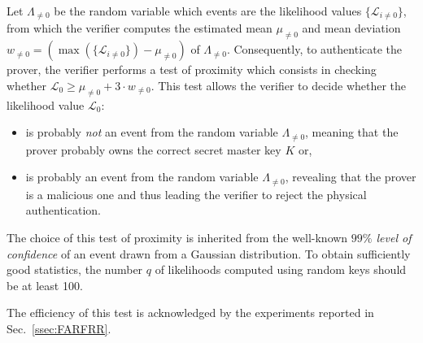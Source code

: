 Let \(\Lambda_{\not={0}}\) be the random variable which events are the likelihood values $\{\mathcal{L}_{i\not={0}}\}$, from which the verifier computes the estimated mean \(\mu_{\not={0}} \) and mean deviation $w_{\not={0}}=(\max(\{\mathcal{L}_{i\not={0}}\}) - \mu_{\not={0}})$ of  $\Lambda_{\not={0}}$. Consequently, to authenticate the prover, the verifier performs a test of proximity which consists in checking whether \(\mathcal{L}_0 \geq \mu_{\not={0}} + 3\cdot w_{\not={0}} \).
This test allows the verifier to decide whether the likelihood value \(\mathcal{L}_0 \):
\begin{itemize}
\item is probably {\it not} an event from the random variable \(\Lambda_{\not={0}}\), meaning that the prover probably owns the correct secret master key $K$ or,
\item is probably an event from the random variable \(\Lambda_{\not={0}}\), revealing that the prover is a malicious one and thus leading the verifier to reject the physical authentication.
\end{itemize} 
The choice of this test of proximity is inherited from the well-known \textit{$99\%$ level of confidence} of an event drawn from a Gaussian distribution. To obtain sufficiently good statistics, the number $q$ of  likelihoods computed using random keys should be at least 100.

The efficiency of this test is acknowledged by the experiments reported in Sec.~\ref{ssec:FARFRR}.
